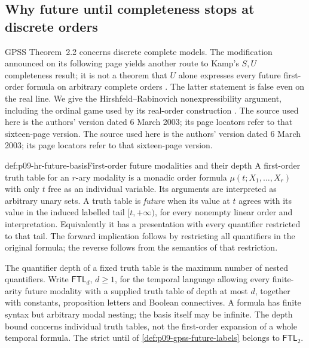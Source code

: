 
\subsection{Why future until completeness stops at discrete orders}
\label{sec:p09-gpss-complete-order-complement}

GPSS Theorem~2.2 concerns discrete complete models. The modification
announced on its following page yields another route to Kamp's
\(S,U\) completeness result; it is not a theorem that \(U\)
alone expresses every future first-order formula on arbitrary complete
orders \cite[pp.~170--171]{GabbayPnueliShelahStavi1980}.
The latter statement is false even on the real line. We give the
Hirshfeld--Rabinovich nonexpressibility argument, including the ordinal
game used by its real-order construction
\cite[secs.~2--4 and appendix~A]{HirshfeldRabinovich2003Future}.
The source used here is the authors' version dated 6 March 2003;
its page locators refer to that sixteen-page version.
The source used here is the authors' version dated 6 March 2003;
its page locators refer to that sixteen-page version.

\begin{hbdefinition}{def:p09-hr-future-basis}{First-order future modalities and their depth}
A first-order truth table for an \(r\)-ary modality is a monadic
order formula \(\mu(t;X_1,\ldots,X_r)\) with only \(t\)
free as an individual variable. Its arguments are interpreted as
arbitrary unary sets. A truth table is \emph{future} when its value
at \(t\) agrees with its value in the induced labelled tail
\([t,+\infty)\), for every nonempty linear order and interpretation.
Equivalently it has a presentation with every quantifier restricted
to that tail. The forward implication follows by restricting all
quantifiers in the original formula; the reverse follows from the
semantics of that restriction.

The quantifier depth of a fixed truth table is the maximum number
of nested quantifiers. Write \(\mathsf{FTL}_d\), \(d\geq1\),
for the temporal language allowing every finite-arity future modality
with a supplied truth table of depth at most \(d\), together with
constants, proposition letters and Boolean connectives. A formula
has finite syntax but arbitrary modal nesting; the basis itself
may be infinite. The depth bound concerns individual truth tables,
not the first-order expansion of a whole temporal formula.
The strict until of \cref{def:p09-gpss-future-labels} belongs
to \(\mathsf{FTL}_2\).
\end{hbdefinition}

